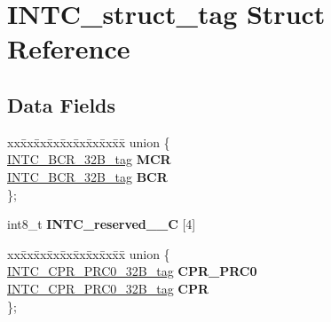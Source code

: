\hypertarget{structINTC__struct__tag}{}\section{I\+N\+T\+C\+\_\+struct\+\_\+tag Struct Reference}
\label{structINTC__struct__tag}
\subsection*{Data Fields}
\begin{DoxyCompactItemize}
\item 
\mbox{\label{structINTC__struct__tag_a093347854d7283ac5b3a984d12f09785}} 
\begin{tabbing}
xx\=xx\=xx\=xx\=xx\=xx\=xx\=xx\=xx\=\kill
union \{\\
\>\mbox{\hyperlink{unionINTC__BCR__32B__tag}{INTC\_BCR\_32B\_tag}} {\bfseries MCR}\\
\>\mbox{\hyperlink{unionINTC__BCR__32B__tag}{INTC\_BCR\_32B\_tag}} {\bfseries BCR}\\
\}; \\

\end{tabbing}\item 
\mbox{\label{structINTC__struct__tag_a7eb132a937baf7d7c916622fea89845e}} 
int8\+\_\+t {\bfseries I\+N\+T\+C\+\_\+reserved\+\_\+\_\+C} \mbox{[}4\mbox{]}
\item 
\mbox{\label{structINTC__struct__tag_a2967fa93a0565af58b482326b82035de}} 
\begin{tabbing}
xx\=xx\=xx\=xx\=xx\=xx\=xx\=xx\=xx\=\kill
union \{\\
\>\mbox{\hyperlink{unionINTC__CPR__PRC0__32B__tag}{INTC\_CPR\_PRC0\_32B\_tag}} {\bfseries CPR\_PRC0}\\
\>\mbox{\hyperlink{unionINTC__CPR__PRC0__32B__tag}{INTC\_CPR\_PRC0\_32B\_tag}} {\bfseries CPR}\\
\}; \\


\end{tabbing}
\end{DoxyCompactItemize}
